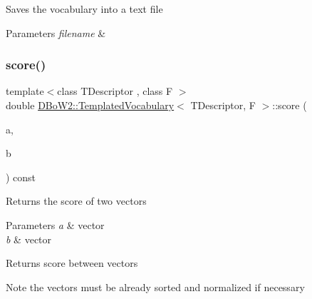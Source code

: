 Saves the vocabulary into a text file 
\begin{DoxyParams}{Parameters}
{\em filename} & \\
\hline
\end{DoxyParams}
\mbox{\label{class_d_bo_w2_1_1_templated_vocabulary_aedde9cc3255e41fd0441055eeb640346}} 
\subsubsection{\texorpdfstring{score()}{score()}}
{\footnotesize\ttfamily template$<$class T\+Descriptor , class F $>$ \\
double \mbox{\hyperlink{class_d_bo_w2_1_1_templated_vocabulary}{D\+Bo\+W2\+::\+Templated\+Vocabulary}}$<$ T\+Descriptor, F $>$\+::score (\begin{DoxyParamCaption}\item[{const \mbox{\hyperlink{class_d_bo_w2_1_1_bow_vector}{Bow\+Vector}} \&}]{a,  }\item[{const \mbox{\hyperlink{class_d_bo_w2_1_1_bow_vector}{Bow\+Vector}} \&}]{b }\end{DoxyParamCaption}) const\hspace{0.3cm}{\ttfamily [inline]}}

Returns the score of two vectors 
\begin{DoxyParams}{Parameters}
{\em a} & vector \\
\hline
{\em b} & vector \\
\hline
\end{DoxyParams}
\begin{DoxyReturn}{Returns}
score between vectors 
\end{DoxyReturn}
\begin{DoxyNote}{Note}
the vectors must be already sorted and normalized if necessary 
\end{DoxyNote}
\mbox{\label{class_d_bo_w2_1_1_templated_vocabulary_af7bf0ecd2d1ecc7d31ddca3aa7d1ddc8}} 
